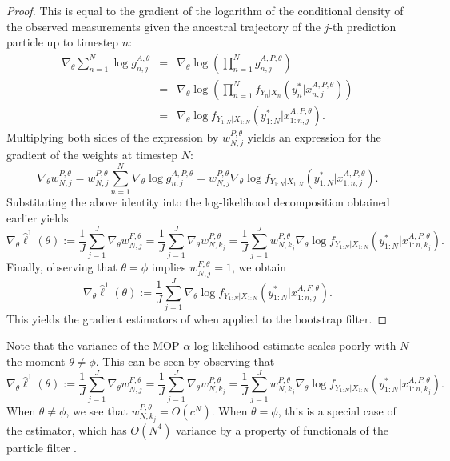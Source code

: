 \begin{proof}
This is equal to the gradient of the logarithm of the conditional density of the observed measurements given the ancestral trajectory of the $j$-th prediction particle up to timestep $n$:
\begin{eqnarray*}  
\nabla_\theta \sum_{n=1}^N \log g_{n,j}^{A,\theta} &=& \nabla_\theta \log\left(\prod_{n=1}^N g_{n,j}^{A,P,\theta}\right) 
\\
&=&  \nabla_\theta \log\left(\prod_{n=1}^N f_{Y_n|X_n}\left(y_n^* | x_{n,j}^{A, P,\theta}\right)\right)
\\
&=& \nabla_\theta \log f_{Y_{1:N}|X_{1:N}}\left(y_{1:N}^* | x_{1:n,j}^{A, P,\theta}\right).
\end{eqnarray*}
Multiplying both sides of the expression by $w_{N,j}^{P,\theta} $ yields an expression for the gradient of the weights at timestep $N$:
$$\nabla_\theta w_{N,j}^{P,\theta} = w_{N,j}^{P,\theta} \sum_{n=1}^N \nabla_\theta \log g_{n,j}^{A,P,\theta} = w_{N,j}^{P,\theta} \nabla_\theta \log f_{Y_{1:N}|X_{1:N}}\left(y_{1:N}^* | x_{1:n,j}^{A, P,\theta}\right).$$
Substituting the above identity into the log-likelihood decomposition obtained earlier  yields
\begin{equation*}
    \nabla_\theta \hat{\ell}^1(\theta) := \frac{1}{J}\sum_{j=1}^J \nabla_\theta w_{N,j}^{F,\theta} =\frac{1}{J}\sum_{j=1}^J \nabla_\theta w_{N,k_j}^{P,\theta} = \frac{1}{J}\sum_{j=1}^J w_{N,k_j}^{P,\theta} \nabla_\theta \log f_{Y_{1:N}|X_{1:N}}\left(y_{1:N}^* | x_{1:n,k_j}^{A, P,\theta}\right).
\end{equation*}
Finally, observing that $\theta=\phi$ implies $w_{N,j}^{F,\theta}=1$, we obtain 
\begin{equation*}
    \nabla_\theta \hat{\ell}^1(\theta) := \frac{1}{J}\sum_{j=1}^J \nabla_\theta \log f_{Y_{1:N}|X_{1:N}}\left(y_{1:N}^* | x_{1:n,j}^{A, F,\theta}\right).
\end{equation*}
This yields the gradient estimators of \cite{poyiadjis11, scibior21} when applied to the bootstrap filter. 
\end{proof}

Note that the variance of the MOP-$\alpha$ log-likelihood estimate scales poorly with $N$ the moment $\theta\neq\phi$. 
This can be seen by observing that
\begin{equation*}
    \nabla_\theta \hat{\ell}^1(\theta) := \frac{1}{J}\sum_{j=1}^J \nabla_\theta w_{N,j}^{F,\theta} =\frac{1}{J}\sum_{j=1}^J \nabla_\theta w_{N,k_j}^{P,\theta} = \frac{1}{J}\sum_{j=1}^J w_{N,k_j}^{P,\theta} \nabla_\theta \log f_{Y_{1:N}|X_{1:N}}\left(y_{1:N}^* | x_{1:n,k_j}^{A, P,\theta}\right).
\end{equation*}
When $\theta\neq\phi$, we see that $w_{N,k_j}^{P,\theta} = O(c^N)$. 
When $\theta=\phi$, this is a special case of the \cite{poyiadjis11} estimator, which has $O(N^4)$ variance by a property of functionals of the particle filter \cite{delMoral03}. 

